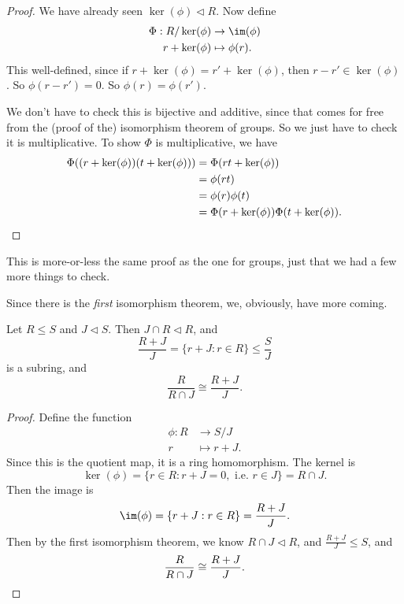 \documentclass[a4paper]{article}
\begin{document}
\begin{proof}
  We have already seen $\ker(\phi) \lhd R$. Now define
  \begin{align*}
    \Phi: R/\ker(\phi) &\to \im(\phi)\\
    r + \ker(\phi) &\mapsto \phi(r).
  \end{align*}
  This well-defined, since if $r + \ker(\phi) = r' + \ker(\phi)$, then $r - r' \in \ker(\phi)$. So $\phi(r - r') = 0$. So $\phi(r) = \phi(r')$.

  We don't have to check this is bijective and additive, since that comes for free from the (proof of the) isomorphism theorem of groups. So we just have to check it is multiplicative. To show $\Phi$ is multiplicative, we have
  \begin{align*}
    \Phi((r + \ker(\phi))(t + \ker(\phi))) &= \Phi(rt + \ker(\phi)) \\
    &= \phi(rt) \\
    &= \phi(r)\phi(t) \\
    &= \Phi(r + \ker(\phi)) \Phi(t + \ker(\phi)).\qedhere
  \end{align*}
\end{proof}
This is more-or-less the same proof as the one for groups, just that we had a few more things to check.

Since there is the \emph{first} isomorphism theorem, we, obviously, have more coming.

\begin{thm}
  Let $R \leq S$ and $J \lhd S$. Then $J \cap R \lhd R$, and
  \[
    \frac{R + J}{J} = \{r + J: r \in R\} \leq \frac{S}{J}
  \]
  is a subring, and
  \[
    \frac{R}{R \cap J} \cong \frac{R + J}{J}.
  \]
\end{thm}

\begin{proof}
  Define the function
  \begin{align*}
    \phi: R &\to S/J\\
    r &\mapsto r + J.
  \end{align*}
  Since this is the quotient map, it is a ring homomorphism. The kernel is
  \[
    \ker(\phi) = \{r \in R: r + J = 0,\text{ i.e.\ } r \in J\} = R \cap J.
  \]
  Then the image is
  \[
    \im(\phi) = \{r + J: r \in R\} = \frac{R + J}{J}.
  \]
  Then by the first isomorphism theorem, we know $R \cap J \lhd R$, and $\frac{R + J}{J} \leq S$, and
  \[
    \frac{R}{R \cap J} \cong \frac{R + J}{J}.\qedhere
  \]
\end{proof}
\end{document}
